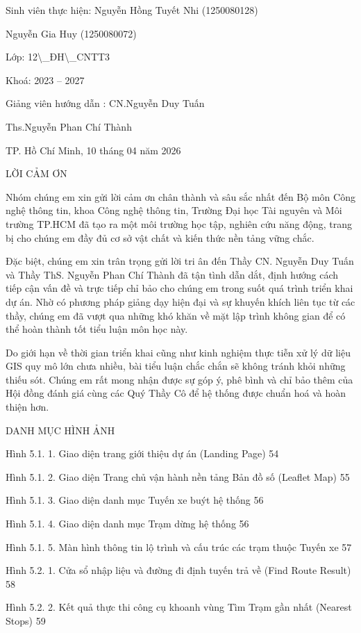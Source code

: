 \documentclass[13pt,a4paper]{report}
\begin{document}
Sinh viên thực hiện:	Nguyễn Hồng Tuyết Nhi (1250080128)

Nguyễn Gia Huy (1250080072)

Lớp:   12\textbackslash{}_ĐH\textbackslash{}_CNTT3

Khoá:   2023 – 2027

Giảng viên hướng dẫn : CN.Nguyễn Duy Tuấn

Ths.Nguyễn Phan Chí Thành

TP. Hồ Chí Minh, 10  tháng 04  năm 2026

LỜI CẢM ƠN

Nhóm chúng em xin gửi lời cảm ơn chân thành và sâu sắc nhất đến Bộ môn Công nghệ thông tin, khoa Công nghệ thông tin, Trường Đại học Tài nguyên và Môi trường TP.HCM đã tạo ra một môi trường học tập, nghiên cứu năng động, trang bị cho chúng em đầy đủ cơ sở vật chất và kiến thức nền tảng vững chắc.

Đặc biệt, chúng em xin trân trọng gửi lời tri ân đến Thầy CN. Nguyễn Duy Tuấn và Thầy ThS. Nguyễn Phan Chí Thành đã tận tình dẫn dắt, định hướng cách tiếp cận vấn đề và trực tiếp chỉ bảo cho chúng em trong suốt quá trình triển khai dự án. Nhờ có phương pháp giảng dạy hiện đại và sự khuyến khích liên tục từ các thầy, chúng em đã vượt qua những khó khăn về mặt lập trình không gian để có thể hoàn thành tốt tiểu luận môn học này.

Do giới hạn về thời gian triển khai cũng như kinh nghiệm thực tiễn xử lý dữ liệu GIS quy mô lớn chưa nhiều, bài tiểu luận chắc chắn sẽ không tránh khỏi những thiếu sót. Chúng em rất mong nhận được sự góp ý, phê bình và chỉ bảo thêm của Hội đồng đánh giá cùng các Quý Thầy Cô để hệ thống được chuẩn hoá và hoàn thiện hơn.

DANH MỤC HÌNH ẢNH

Hình 5.1. 1. Giao diện trang giới thiệu dự án (Landing Page)	54

Hình 5.1. 2. Giao diện Trang chủ vận hành nền tảng Bản đồ số (Leaflet Map)	55

Hình 5.1. 3. Giao diện danh mục Tuyến xe buýt hệ thống	56

Hình 5.1. 4. Giao diện danh mục Trạm dừng  hệ thống	56

Hình 5.1. 5. Màn hình thông tin lộ trình và cấu trúc các trạm thuộc Tuyến xe	57

Hình 5.2. 1. Cửa sổ nhập liệu và đường đi định tuyến trả về (Find Route Result)	58

Hình 5.2. 2. Kết quả thực thi công cụ khoanh vùng Tìm Trạm gần nhất (Nearest Stops)	59
\end{document}
